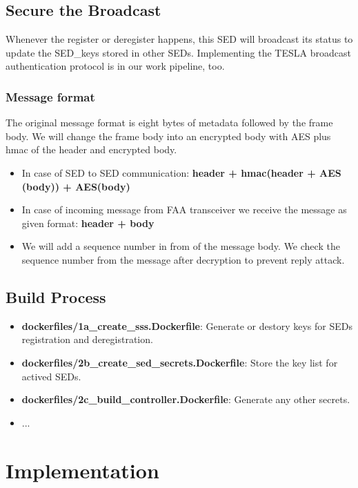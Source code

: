 \documentclass[11pt,oneside,onecolumn,letterpaper]{article}
\begin{document}
\subsection{Secure the Broadcast}
Whenever the register or deregister happens, this SED will broadcast its status to update the SED\_keys stored in other SEDs.
Implementing the TESLA broadcast authentication protocol is in our work pipeline, too.

\subsubsection{Message format}
The original message format is eight bytes of metadata followed by the frame body.
We will change the frame body into an encrypted body with AES plus hmac of the header and encrypted body.

  \begin{itemize}
  \item In case of SED to SED communication: \textbf{header + hmac(header + AES (body)) + AES(body)}
  \item In case of incoming message from FAA transceiver we receive the message as given format: \textbf{header + body}
  \end{itemize}
  \begin{itemize}
  \item We will add a sequence number in from of the message body. We check the sequence number from the message after decryption to prevent reply attack.
  \end{itemize}

\subsection{Build Process}

  \begin{itemize}
    \item \textbf{dockerfiles/1a\_create\_sss.Dockerfile}: Generate or destory keys for SEDs registration and deregistration.
    \item \textbf{dockerfiles/2b\_create\_sed\_secrets.Dockerfile}: Store the key list for actived SEDs.
    \item \textbf{dockerfiles/2c\_build\_controller.Dockerfile}: Generate any other secrets.
    \item ...
  \end{itemize}

\section{Implementation}
\end{document}
